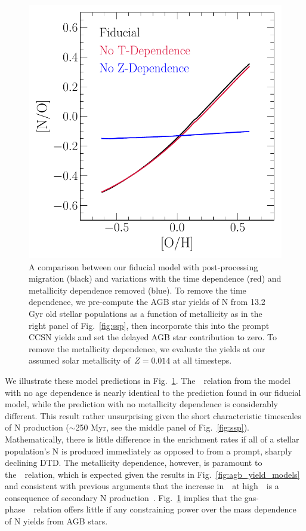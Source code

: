 \documentclass[ms.tex]{subfiles}
\begin{document}
\begin{figure}
\centering
\includegraphics[scale = 0.63]{t_z_dep_comp.pdf}
\caption{
A comparison between our fiducial model with post-processing migration (black)
and variations with the time dependence (red) and metallicity dependence 
removed (blue).
To remove the time dependence, we pre-compute the AGB star yields of N from
13.2 Gyr old stellar populations as a function of metallicity as in the right
panel of Fig.~\ref{fig:ssp}, then incorporate this into the prompt CCSN yields
and set the delayed AGB star contribution to zero.
To remove the metallicity dependence, we evaluate the yields at our assumed
solar metallicity of~$Z = 0.014$ at all timesteps.
}
\label{fig:t_z_dep_comp}
\end{figure}

We illustrate these model predictions in Fig.~\ref{fig:t_z_dep_comp}.
The~\ohno~relation from the model with no age dependence is nearly identical to
the prediction found in our fiducial model, while the prediction with no
metallicity dependence is considerably different.
This result rather unsurprising given the short characteristic timescales of N
production ($\sim$250 Myr, see the middle panel of Fig.~\ref{fig:ssp}).
Mathematically, there is little difference in the enrichment rates if all of a
stellar population's N is produced immediately as opposed to from a prompt,
sharply declining DTD.
The metallicity dependence, however, is paramount to the~\ohno~relation, which
is expected given the results in Fig.~\ref{fig:agb_yield_models} and consistent
with previous arguments that the increase in~\no~at high~\oh~is a consequence
of secondary N production~\citep{VilaCostas1993, vanZee1998, Henry1999,
PerezMontero2009, Berg2012, Pilyugin2012, Andrews2013, HaydenPawson2021}.
Fig.~\ref{fig:t_z_dep_comp} implies that the gas-phase~\ohno~relation offers
little if any constraining power over the mass dependence of N yields from
AGB stars.
\end{document}
